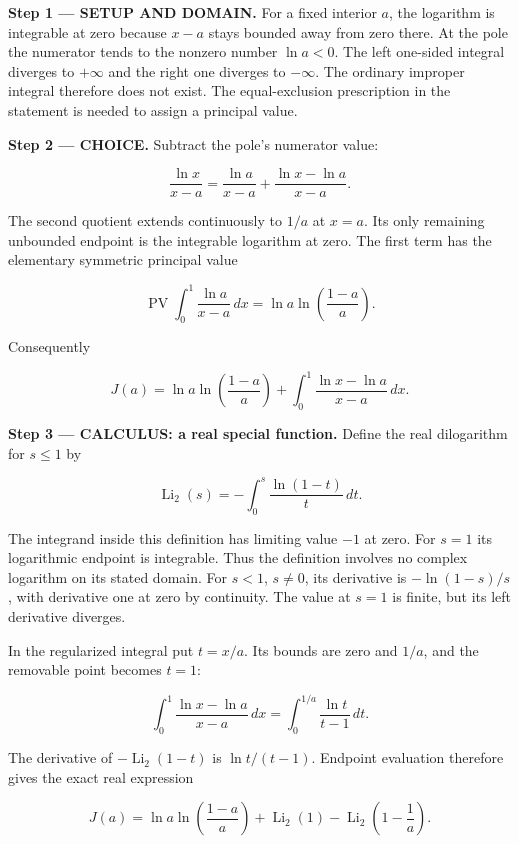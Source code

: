 \documentclass[11pt,oneside,openany]{book}
\begin{document}
\begin{DomainStep}
\textbf{Step 1 --- SETUP AND DOMAIN.} For a fixed interior \(a\), the logarithm is integrable at zero because \(x-a\) stays bounded away from zero there. At the pole the numerator tends to the nonzero number \(\ln a<0\). The left one-sided integral diverges to \(+\infty\) and the right one diverges to \(-\infty\). The ordinary improper integral therefore does not exist. The equal-exclusion prescription in the statement is needed to assign a principal value.

\end{DomainStep}
\begin{ChoiceStep}
\textbf{Step 2 --- CHOICE.} Subtract the pole's numerator value:

\[
\frac{\ln x}{x-a}
=\frac{\ln a}{x-a}+\frac{\ln x-\ln a}{x-a}.
\]

The second quotient extends continuously to \(1/a\) at \(x=a\). Its only remaining unbounded endpoint is the integrable logarithm at zero. The first term has the elementary symmetric principal value

\[
\operatorname{PV}\int_0^1\frac{\ln a}{x-a}\,dx
=\ln a\ln\left(\frac{1-a}{a}\right).
\]

Consequently

\[
J(a)=\ln a\ln\left(\frac{1-a}{a}\right)
+\int_0^1\frac{\ln x-\ln a}{x-a}\,dx.
\]

\end{ChoiceStep}
\textbf{Step 3 --- CALCULUS: a real special function.} Define the real dilogarithm for \(s\le1\) by

\[
\operatorname{Li}_2(s)=-\int_0^s\frac{\ln(1-t)}t\,dt.
\]

The integrand inside this definition has limiting value \(-1\) at zero. For \(s=1\) its logarithmic endpoint is integrable. Thus the definition involves no complex logarithm on its stated domain. For \(s<1\), \(s\ne0\), its derivative is \(-\ln(1-s)/s\), with derivative one at zero by continuity. The value at \(s=1\) is finite, but its left derivative diverges.

In the regularized integral put \(t=x/a\). Its bounds are zero and \(1/a\), and the removable point becomes \(t=1\):

\[
\int_0^1\frac{\ln x-\ln a}{x-a}\,dx
=\int_0^{1/a}\frac{\ln t}{t-1}\,dt.
\]

The derivative of \(-\operatorname{Li}_2(1-t)\) is \(\ln t/(t-1)\). Endpoint evaluation therefore gives the exact real expression

\[
J(a)=\ln a\ln\left(\frac{1-a}{a}\right)
+\operatorname{Li}_2(1)-\operatorname{Li}_2\left(1-\frac1a\right).
\]
\end{document}
